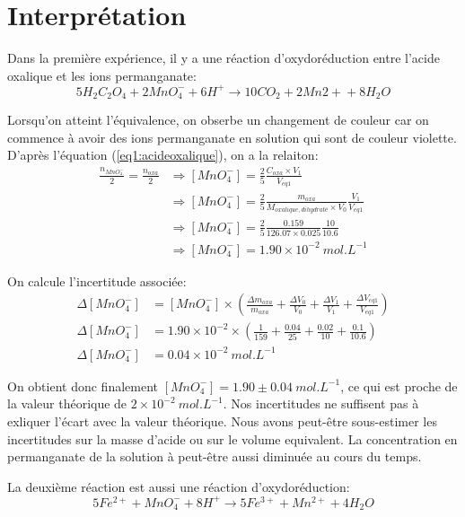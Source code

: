 \documentclass[12pt]{article}
\begin{document}
\section{Interprétation}
Dans la première expérience, il y a une réaction d'oxydoréduction entre l'acide oxalique et les ions permanganate:
\begin{equation}
    5H_2C_2O_4 + 2MnO_4^{-} + 6H^+  \longrightarrow  10 CO_2 + 2 Mn{2+} + 8H_2O 
    \label{eq1:acideoxalique}
\end{equation}

Lorsqu'on atteint l'équivalence, on obserbe un changement de couleur car on commence à avoir des ions permanganate en solution qui sont de couleur violette.
D'après l'équation (\ref{eq1:acideoxalique}), on a la relaiton:
\begin{align*}
    \frac{n_{MnO_4^-}}{2} = \frac{n_{oxa}}{2} & \Rightarrow [MnO_4^-]=\frac{2}{5} \frac{C_{oxa}\times V_1}{V_{eq1}} \\
    & \Rightarrow [MnO_4^-]=\frac{2}{5} \frac{m_{oxa}}{M_{oxalique,dihydraté}\times V_0}\frac{V_1}{V_{eq1}}\\
    & \Rightarrow [MnO_4^-]=\frac{2}{5} \frac{0.159}{126.07 \times 0.025} \frac{10}{10.6} \\
    & \Rightarrow [MnO_4^-]= 1.90 \times 10^{-2} \ mol.L^{-1}
\end{align*}

On calcule l'incertitude associée:
\begin{align*}
    \Delta [MnO_4^-] & =  [MnO_4^-] \times \left( \frac{\Delta m_{oxa}}{m_{oxa}} + \frac{\Delta V_0}{V_0} + \frac{\Delta V_1}{V_1} + \frac{\Delta V_{eq1}}{V_{eq1}} \right)\\
    \Delta [MnO_4^-] & = 1.90 \times 10^{-2} \times \left( \frac{1}{159} +\frac{0.04}{25} + \frac{0.02}{10} + \frac{0.1}{10.6}  \right) \\
    \Delta [MnO_4^-] & = 0.04 \times 10^{-2} \ mol.L^{-1}
\end{align*}

On obtient donc finalement $[MnO_4^-]=1.90 \pm 0.04 \ mol.L^{-1}$, ce qui est proche de la valeur théorique de $2\times 10^{-2} \ mol.L^{-1}$.
Nos incertitudes ne suffisent pas à exliquer l'écart avec la valeur théorique. 
Nous avons peut-être sous-estimer les incertitudes sur la masse d'acide ou sur le volume equivalent.
La concentration en permanganate de la solution à peut-être aussi diminuée au cours du temps.

La deuxième réaction est aussi une réaction d'oxydoréduction:
\begin{equation}
    5Fe^{2+} + MnO_4^- + 8H^+ \longrightarrow 5Fe^{3+} + Mn^{2+} + 4H_2O 
    \label{eq2:oxydoréduction2}
\end{equation}
\end{document}
